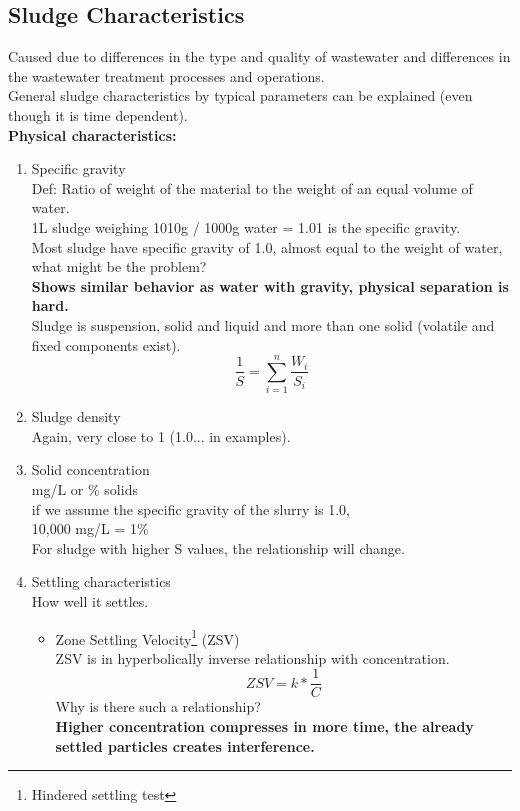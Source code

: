 \documentclass[12pt]{article}
\begin{document}
\subsection{Sludge Characteristics}
Caused due to differences in the type and quality of wastewater and differences in the wastewater treatment processes and operations.\\
General sludge characteristics by typical parameters can be explained (even though it is time dependent).\\
\textbf{Physical characteristics:}
\begin{enumerate}
    \item Specific gravity\\
    Def: Ratio of  weight of the material to the weight of an equal volume of water.\\
    1L sludge weighing 1010g / 1000g water = 1.01 is the specific gravity.\\
    Most sludge have specific gravity of 1.0, almost equal to the weight of water, what might be the problem?\\
    \textbf{Shows similar behavior as water with gravity, physical separation is hard.}\\
    Sludge is suspension, solid and liquid and more than one solid (volatile and fixed components exist).
    \[\frac{1}{S}= \sum_{i=1}^{n} \frac{W_i}{S_i}\]
    \item Sludge density\\
    Again, very close to 1 (1.0... in examples).
    \item Solid concentration\\ %
    mg/L or \% solids\\
    if we assume the specific gravity of the slurry is 1.0,\\
    10,000 mg/L = 1\%\\
    For sludge with higher S values, the relationship will change.
    \item Settling characteristics\\
    How well it settles.
    \begin{itemize}
        \item Zone Settling Velocity\footnote{Hindered settling test} (ZSV)\\
        ZSV is in hyperbolically inverse relationship with concentration.
        \[ZSV = k * \frac{1}{C}\]
        Why is there such a relationship?\\
        \textbf{Higher concentration compresses in more time, the already settled particles creates interference.}\\

\end{itemize}
\end{enumerate}
\end{document}
